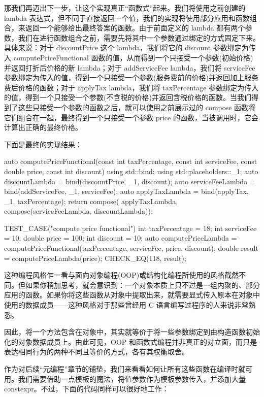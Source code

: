那我们再迈出下一步，让这个实现真正“函数式”起来。我们将使用之前创建的 lambda 表达式，但不同于直接返回一个值，我们的实现将使用部分应用和函数组合，来返回一个能够给出最终答案的函数。由于前面定义的 lambda 都有两个参数，我们在进行函数组合之前，需要先将其中一个参数通过绑定的方式固定下来。具体来说：对于 discountPrice 这个 lambda，我们将它的 discount 参数绑定为传入 computePriceFunctional 函数的值，从而得到一个只接受一个参数(初始价格)并返回打折后价格的新 lambda；对于 addServiceFee lambda，我们将 serviceFee 参数绑定为传入的值，得到一个只接受一个参数(服务费前的价格)并返回加上服务费后价格的函数；对于 applyTax lambda，我们将 taxPercentage 参数绑定为传入的值，得到一个只接受一个参数(不含税的价格)并返回含税价格的函数。当我们得到了这些只接受一个参数的函数之后，就可以使用之前展示过的 compose 函数将它们组合在一起，最终得到一个只接受一个参数 price 的函数，当被调用时，它会计算出正确的最终价格。

下面是最终的实现结果：

\begin{cpp}
auto computePriceFunctional(const int taxPercentage, const int
serviceFee, const double price, const int discount){
  using std::bind;
  using std::placeholders::_1;
  auto discountLambda = bind(discountPrice, _1, discount);
  auto serviceFeeLambda = bind(addServiceFee, _1, serviceFee);
  auto applyTaxLambda = bind(applyTax, _1, taxPercentage);
  return compose( applyTaxLambda, compose(serviceFeeLambda,
  discountLambda));
}

TEST_CASE("compute price functional"){
  int taxPercentage = 18;
  int serviceFee = 10;
  double price = 100;
  int discount = 10;
  auto computePriceLambda = computePriceFunctional(taxPercentage,
  serviceFee, price, discount);
  double result = computePriceLambda(price);
  CHECK_EQ(118, result);
}
\end{cpp}

这种编程风格乍一看与面向对象编程(OOP)或结构化编程所使用的风格截然不同。但如果你稍加思考，就会意识到：一个对象本质上只不过是一组内聚的、部分应用的函数。如果你将这些函数从对象中提取出来，就需要显式传入原本在对象中使用的数据成员——这种风格对于那些曾经用 C 语言编写过程序的人来说非常熟悉。

因此，将一个方法包含在对象中，其实就等价于将一些参数绑定到由构造函数初始化的对象数据成员上。由此可见，OOP 和函数式编程并非真正的对立面，而只是表达相同行为的两种不同且等价的方式，各有其权衡取舍。

作为对后续“元编程”章节的铺垫，我们来看看如何让所有这些函数在编译时就可用。我们需要借助一点模板的魔法，将值参数作为模板参数传入，并添加大量 constexpr。不过，下面的代码同样可以很好地工作：

